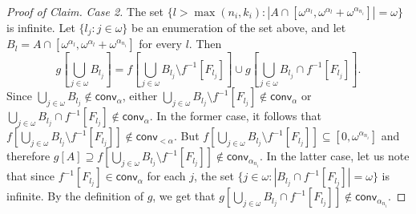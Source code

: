 \documentclass[10pt,a4paper]{amsart}
\newcommand{\conv}{\mathsf{conv}}
\renewcommand{\subset}{\subseteq}
\begin{document}
\begin{proof}[Proof of Claim]
\emph{Case 2.} The set $\{l>\max(n_i,k_i) : |A\cap [\omega^{\alpha_l}, \omega^{\alpha_l}+\omega^{\alpha_{n_i}}]|=\omega\}$ is infinite.
Let $\{l_j :j\in\omega\}$ be an
enumeration of the set above, and let $B_l=A\cap [\omega^{\alpha_l}, \omega^{\alpha_l}+\omega^{\alpha_{n_i}}]$ for every $l$.
Then
$$g\left[\bigcup_{j\in\omega} B_{l_j}\right]=f\left[\bigcup_{j\in\omega} B_{l_j}\setminus f^{-1}[F_{l_j}]\right]\cup g\left[\bigcup_{j\in\omega} B_{l_j}\cap f^{-1}[F_{l_j} ]\right] .$$
Since $\bigcup_{j\in\omega} B_{l_j}\notin\conv_\alpha$, either $\bigcup_{j\in\omega} B_{l_j}\setminus f^{-1}[F_{l_j}]\notin\conv_\alpha$ or  $\bigcup_{j\in\omega} B_{l_j}\cap f^{-1}[F_{l_j} ]\not\in\conv_\alpha$. In the former case, it follows that $f[\bigcup_{j\in\omega} B_{l_j}\setminus f^{-1}[F_{l_j}]]\notin\conv_{<\alpha}$. But $f[\bigcup_{j\in\omega} B_{l_j}\setminus f^{-1}[F_{l_j}]]\subset [0,\omega^{\alpha_{n_i}}]$ and therefore $g[A]\supseteq f[\bigcup_{j\in\omega} B_{l_j}\setminus f^{-1}[F_{l_j}]]\notin\conv_{\alpha_{n_i}}$. In the latter case, let us note that since $f^{-1}[F_{l_j}]\in\conv_\alpha$ for each $j$, the set $\{j\in\omega : |B_{l_j}\cap f^{-1}[F_{l_j}]|=\omega\}$ is infinite. By the definition of $g$, we get that $ g[\bigcup_{j\in\omega} B_{l_j}\cap f^{-1}[F_{l_j} ]] \notin\conv_{\alpha_{n_i}}$.
\end{proof}
\end{document}

